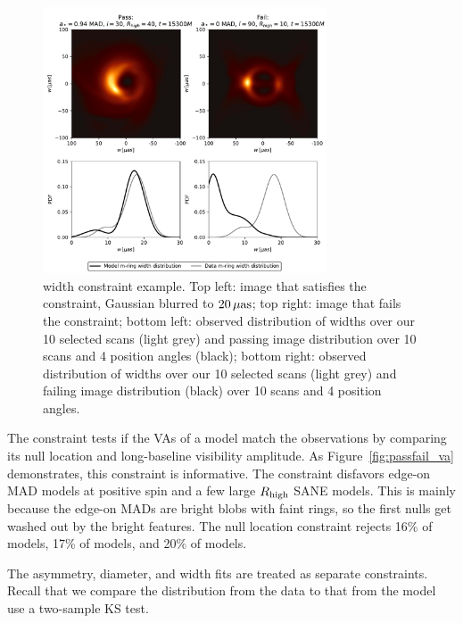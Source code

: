 \begin{figure}
  \centering
  \includegraphics[width=0.75\textwidth]{figures/mring_width_example.pdf}
  \caption{\Mring width constraint example.  Top left: image that satisfies the constraint, Gaussian blurred to $20\,\mathrm{\mu as}$; top right: image that fails the constraint; bottom left: observed distribution of \mring widths over our 10 selected scans (light grey) and passing image distribution over 10 scans and 4 position angles (black); bottom right: observed distribution of \mring widths over our 10 selected scans (light grey) and failing image distribution (black) over 10 scans and 4 position angles.
  }
  \label{fig:mring_width_example}
\end{figure}

The \vam constraint tests if the VAs of a model match the
observations by comparing its null location and long-baseline visibility
amplitude.  As Figure~\ref{fig:passfail_va} demonstrates, this constraint is
informative.  The constraint disfavors edge-on MAD models at positive spin and a few large $R_\mathrm{high}$ SANE models.  This is mainly because the edge-on MADs are bright blobs with faint rings, so the first nulls get washed out by the bright features.  The null location constraint rejects 16\% of \kharma models, 17\% of \bhac models, and 20\% of \hamr models.

\label{sec:mring}

The \mring asymmetry, diameter, and width fits are treated as separate constraints.  Recall that we compare the distribution from the data to that from the model use a two-sample KS test. 

